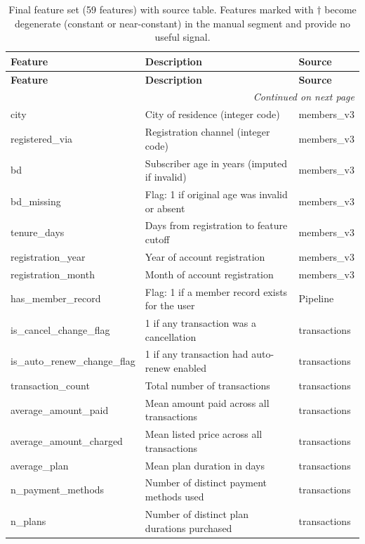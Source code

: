 \documentclass{article}
\begin{document}
\renewcommand{\arraystretch}{1.3}
\begin{longtable}{|l|p{7.5cm}|l|}
\hline
\textbf{Feature} & \textbf{Description} & \textbf{Source} \\ \hline
\endfirsthead
\hline
\textbf{Feature} & \textbf{Description} & \textbf{Source} \\ \hline
\endhead
\hline
\multicolumn{3}{r}{\small\textit{Continued on next page}} \\
\endfoot
\hline
\caption{Final feature set (59 features) with source table. Features marked with $\dagger$ become degenerate (constant or near-constant) in the manual segment and provide no useful signal.}
\label{tab:features59}
\endlastfoot
city & City of residence (integer code) & members\_v3 \\ \hline
registered\_via & Registration channel (integer code) & members\_v3 \\ \hline
bd & Subscriber age in years (imputed if invalid) & members\_v3 \\ \hline
bd\_missing & Flag: 1 if original age was invalid or absent & members\_v3 \\ \hline
tenure\_days & Days from registration to feature cutoff & members\_v3 \\ \hline
registration\_year & Year of account registration & members\_v3 \\ \hline
registration\_month & Month of account registration & members\_v3 \\ \hline
has\_member\_record & Flag: 1 if a member record exists for the user & Pipeline \\ \hline
is\_cancel\_change\_flag & 1 if any transaction was a cancellation & transactions \\ \hline
is\_auto\_renew\_change\_flag & 1 if any transaction had auto-renew enabled & transactions \\ \hline
transaction\_count & Total number of transactions & transactions \\ \hline
average\_amount\_paid & Mean amount paid across all transactions & transactions \\ \hline
average\_amount\_charged & Mean listed price across all transactions & transactions \\ \hline
average\_plan & Mean plan duration in days & transactions \\ \hline
n\_payment\_methods & Number of distinct payment methods used & transactions \\ \hline
n\_plans & Number of distinct plan durations purchased & transactions \\ \hline

\end{longtable}
\end{document}
